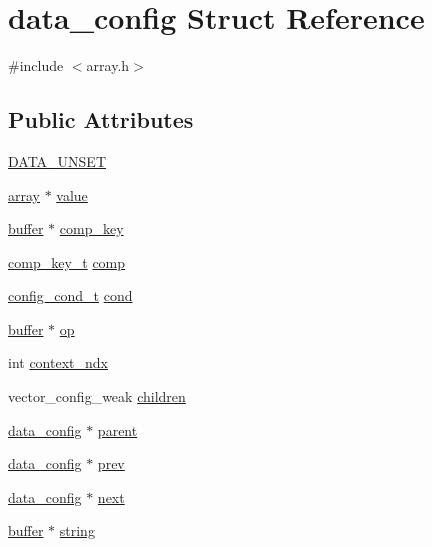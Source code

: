 \hypertarget{structdata__config}{\section{data\-\_\-config Struct Reference}
\label{structdata__config}
}


{\ttfamily \#include $<$array.\-h$>$}

\subsection*{Public Attributes}
\begin{DoxyCompactItemize}
\item 
\hyperlink{structdata__config_a2aee520a0f3d8c6bc21385ba8602205f}{D\-A\-T\-A\-\_\-\-U\-N\-S\-E\-T}
\item 
\hyperlink{structarray}{array} $\ast$ \hyperlink{structdata__config_a166f134074b3cdb339cd6f981079f97d}{value}
\item 
\hyperlink{structbuffer}{buffer} $\ast$ \hyperlink{structdata__config_a17a994d31e938722167e19b5f59b8796}{comp\-\_\-key}
\item 
\hyperlink{array_8h_a70eba8cb401a078bd3a4b284e5ab6b83}{comp\-\_\-key\-\_\-t} \hyperlink{structdata__config_a850a9a892b7722bab782ded69eb4ce68}{comp}
\item 
\hyperlink{array_8h_a10cc71acfa696fcbf3807d5dfa50a137}{config\-\_\-cond\-\_\-t} \hyperlink{structdata__config_a32e710d73d1c5af42cd41b77162e0013}{cond}
\item 
\hyperlink{structbuffer}{buffer} $\ast$ \hyperlink{structdata__config_a16bbe4b9c4da475f530a55cad682508d}{op}
\item 
int \hyperlink{structdata__config_a213f0e25f7057b689b947be0642fae90}{context\-\_\-ndx}
\item 
vector\-\_\-config\-\_\-weak \hyperlink{structdata__config_a58a7a7b9dc732052d6114662d688f30e}{children}
\item 
\hyperlink{structdata__config}{data\-\_\-config} $\ast$ \hyperlink{structdata__config_a673869c2a2837fdde35d7ce85ef2165f}{parent}
\item 
\hyperlink{structdata__config}{data\-\_\-config} $\ast$ \hyperlink{structdata__config_a521a2a5a29d23447ad150324c9705128}{prev}
\item 
\hyperlink{structdata__config}{data\-\_\-config} $\ast$ \hyperlink{structdata__config_af34a7ae7d4a627191cab13e2ff114df3}{next}
\item 
\hyperlink{structbuffer}{buffer} $\ast$ \hyperlink{structdata__config_a6198a6b7dc4dd6ed678be1571890e152}{string}
\end{DoxyCompactItemize}


